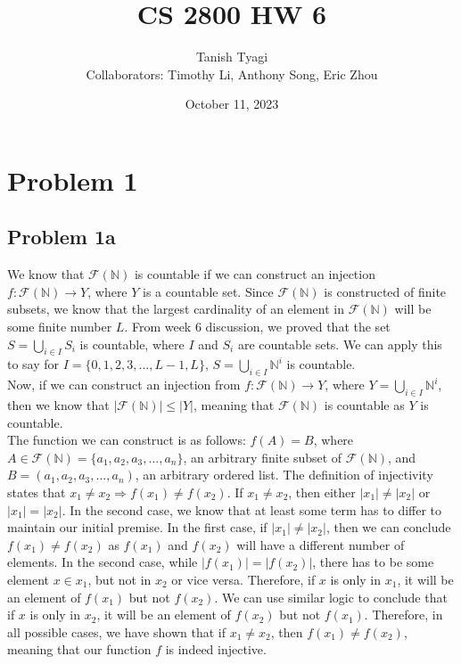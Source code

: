 \documentclass{article}
\title{\textbf{CS 2800 HW 6}}
\author{Tanish Tyagi \\ Collaborators: Timothy Li, Anthony Song, Eric Zhou}
\date{October 11, 2023}
\begin{document}
\maketitle

\section{Problem 1}

\subsection{Problem 1a}

We know that $\mathcal{F}(\mathbb{N})$ is countable if we can construct an injection $f: \mathcal{F}(\mathbb{N}) \rightarrow Y$, where $Y$ is a countable set. Since $\mathcal{F}(\mathbb{N})$ is constructed of finite subsets, we know that the largest cardinality of an element in $\mathcal{F}(\mathbb{N})$ will be some finite number $L$. From week 6 discussion, we proved that the set $S = \bigcup_{i \in I} S_{i}$ is countable, where $I$ and $S_i$ are countable sets. We can apply this to say for $I = \{0, 1, 2, 3, ..., L - 1, L\}$, $S = \bigcup_{i \in I} \mathbb{N}^i$ is countable. \\

Now, if we can construct an injection from $f: \mathcal{F}(\mathbb{N}) \rightarrow Y$, where $Y =\bigcup_{i \in I} \mathbb{N}^i$, then we know that $|\mathcal{F}(\mathbb{N})| \le |Y|$, meaning that $\mathcal{F}(\mathbb{N})$ is countable as $Y$ is countable. \\

The function we can construct is as follows: $f(A) = B$, where $A \in \mathcal{F}(\mathbb{N}) = \{a_1, a_2, a_3, ..., a_n\}$, an arbitrary finite subset of $\mathcal{F}(\mathbb{N})$, and $B = (a_1, a_2, a_3, ..., a_n)$, an arbitrary ordered list. The definition of injectivity states that $x_1 \neq x_2 \Rightarrow f(x_1) \neq f(x_2)$. If $x_1 \neq x_2$, then either $|x_1| \neq |x_2|$ or $|x_1| = |x_2|$. In the second case, we know that at least some term has to differ to maintain our initial premise. In the first case, if $|x_1| \neq |x_2|$, then we can conclude $f(x_1) \neq f(x_2)$ as $f(x_1)$ and $f(x_2)$ will have a different number of elements. In the second case, while $|f(x_1)| = |f(x_2)|$, there has to be some element $x \in x_1$, but not in $x_2$ or vice versa. Therefore, if $x$ is only in $x_1$, it will be an element of $f(x_1)$ but not $f(x_2)$. We can use similar logic to conclude that if $x$ is only in $x_2$, it will be an element of $f(x_2)$ but not $f(x_1)$. Therefore, in all possible cases, we have shown that if $x_1 \neq x_2$, then $f(x_1) \neq f(x_2)$, meaning that our function $f$ is indeed injective. \\
\end{document}
